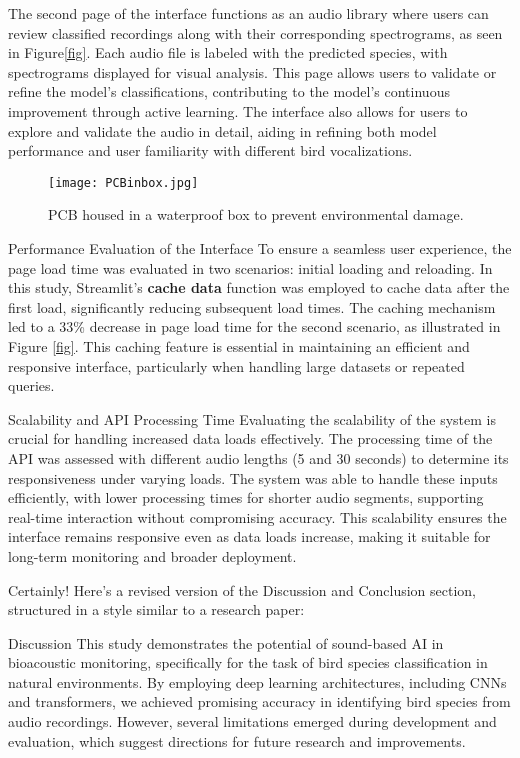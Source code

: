 The second page of the interface functions as an audio library where users can review classified recordings along with their corresponding spectrograms, as seen in Figure\ref{fig}. Each audio file is labeled with the predicted species, with spectrograms displayed for visual analysis. This page allows users to validate or refine the model’s classifications, contributing to the model’s continuous improvement through active learning. The interface also allows for users to explore and validate the audio in detail, aiding in refining both model performance and user familiarity with different bird vocalizations.

\begin{figure}[h]
    \centering
    \texttt{[image: PCBinbox.jpg]}
    \caption{PCB housed in a waterproof box to prevent environmental damage.}
    \vspace{0.1cm}
    \label{fig:pcb_box}
\end{figure}

Performance Evaluation of the Interface
To ensure a seamless user experience, the page load time was evaluated in two scenarios: initial loading and reloading. In this study, Streamlit’s \textbf{cache data} function was employed to cache data after the first load, significantly reducing subsequent load times. The caching mechanism led to a 33\% decrease in page load time for the second scenario, as illustrated in Figure \ref{fig}. This caching feature is essential in maintaining an efficient and responsive interface, particularly when handling large datasets or repeated queries.

Scalability and API Processing Time
Evaluating the scalability of the system is crucial for handling increased data loads effectively. The processing time of the API was assessed with different audio lengths (5 and 30 seconds) to determine its responsiveness under varying loads. The system was able to handle these inputs efficiently, with lower processing times for shorter audio segments, supporting real-time interaction without compromising accuracy. This scalability ensures the interface remains responsive even as data loads increase, making it suitable for long-term monitoring and broader deployment.


Certainly! Here’s a revised version of the Discussion and Conclusion section, structured in a style similar to a research paper:

Discussion
This study demonstrates the potential of sound-based AI in bioacoustic monitoring, specifically for the task of bird species classification in natural environments. By employing deep learning architectures, including CNNs and transformers, we achieved promising accuracy in identifying bird species from audio recordings. However, several limitations emerged during development and evaluation, which suggest directions for future research and improvements.

